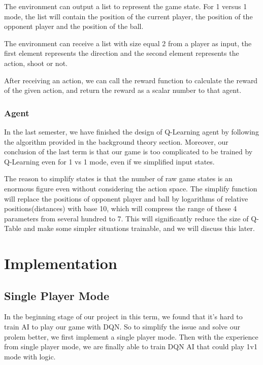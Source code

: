 \documentclass[12pt]{article}
\begin{document}
The environment can output a list to represent the game state. For 1 versus 1 mode, the list will contain the position of the current player, the position of the opponent player and the position of the ball.

The environment can receive a list with size equal 2 from a player as input, the first element represents the direction and the second element represents the action, shoot or not. 

After receiving an action, we can call the reward function to calculate the reward of the given action, and return the reward as a scalar number to that agent.

\subsubsection{Agent}

In the last semester, we have finished the design of Q-Learning agent by following the algorithm provided in the background theory section. Moreover, our conclusion of the last term is that our game is too complicated to be trained by Q-Learning even for 1 vs 1 mode, even if we simplified input states.

The reason to simplify states is that the number of raw game states is an enormous figure even without considering the action space. The simplify function will replace the positions of opponent player and ball by logarithms of relative positions(distances) with base 10, which will compress the range of these 4 parameters from several hundred to 7. This will significantly reduce the size of Q-Table and make some simpler situations trainable, and we will discuss this later.



\section{Implementation}

\subsection{Single Player Mode}
In the beginning stage of our project in this term, we found that it's hard to train AI to play our game with DQN. So to simplify the issue and solve our prolem better, we first implement a single player mode. Then with the experience from single player mode, we are finally able to train DQN AI that could play 1v1 mode with logic.
\end{document}
